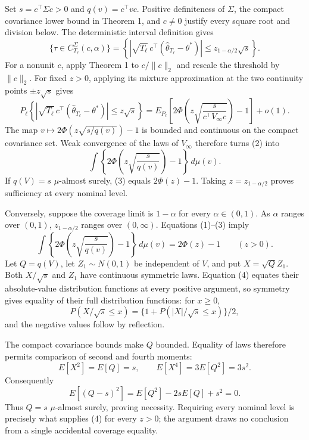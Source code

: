 Set \(s=c^\top\Sigma c>0\) and \(q(v)=c^\top vc\). Positive definiteness of \(\Sigma\), the compact covariance lower bound in Theorem 1, and \(c\ne0\) justify every square root and division below. The deterministic interval definition gives
\[
 \{\tau\in C_{T_\ell}^{\Sigma}(c,\alpha)\}
 =\left\{\left|\sqrt{T_\ell}\,c^\top(\widehat\theta_{T_\ell}-\theta^*)\right|
 \le z_{1-\alpha/2}\sqrt s\right\}. \tag{1}
\]
For a nonunit \(c\), apply Theorem 1 to \(c/\|c\|_2\) and rescale the threshold by \(\|c\|_2\). For fixed \(z>0\), applying its mixture approximation at the two continuity points \(\pm z\sqrt s\) gives
\[
 P_\ell\left\{\left|\sqrt{T_\ell}\,c^\top(\widehat\theta_{T_\ell}-\theta^*)\right|
 \le z\sqrt s\right\}
 =E_{P_\ell}\left[2\Phi\left(z\sqrt{\frac{s}{c^\top V_\infty c}}\right)-1\right]+o(1). \tag{2}
\]
The map \(v\mapsto2\Phi(z\sqrt{s/q(v)})-1\) is bounded and continuous on the compact covariance set. Weak convergence of the laws of \(V_\infty\) therefore turns (2) into
\[
 \int\left\{2\Phi\left(z\sqrt{\frac{s}{q(v)}}\right)-1\right\}\,d\mu(v). \tag{3}
\]
If \(q(V)=s\) \(\mu\)-almost surely, (3) equals \(2\Phi(z)-1\). Taking \(z=z_{1-\alpha/2}\) proves sufficiency at every nominal level.

Conversely, suppose the coverage limit is \(1-\alpha\) for every \(\alpha\in(0,1)\). As \(\alpha\) ranges over \((0,1)\), \(z_{1-\alpha/2}\) ranges over \((0,\infty)\). Equations (1)--(3) imply
\[
 \int\left\{2\Phi\left(z\sqrt{\frac{s}{q(v)}}\right)-1\right\}\,d\mu(v)
 =2\Phi(z)-1\qquad(z>0). \tag{4}
\]
Let \(Q=q(V)\), let \(Z_1\sim N(0,1)\) be independent of \(V\), and put \(X=\sqrt QZ_1\). Both \(X/\sqrt s\) and \(Z_1\) have continuous symmetric laws. Equation (4) equates their absolute-value distribution functions at every positive argument, so symmetry gives equality of their full distribution functions: for \(x\ge0\),
\[
 P(X/\sqrt s\le x)=\{1+P(|X|/\sqrt s\le x)\}/2,
\]
and the negative values follow by reflection.

The compact covariance bounds make \(Q\) bounded. Equality of laws therefore permits comparison of second and fourth moments:
\[
 E[X^2]=E[Q]=s,
 \qquad E[X^4]=3E[Q^2]=3s^2. \tag{5}
\]
Consequently
\[
 E[(Q-s)^2]=E[Q^2]-2sE[Q]+s^2=0. \tag{6}
\]
Thus \(Q=s\) \(\mu\)-almost surely, proving necessity. Requiring every nominal level is precisely what supplies (4) for every \(z>0\); the argument draws no conclusion from a single accidental coverage equality.